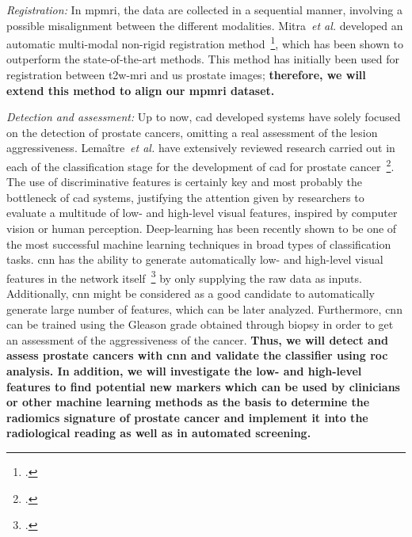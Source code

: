 \emph{Registration:}
In \ac{mpmri}, the data are collected in a sequential manner, involving a possible misalignment between the different modalities.
Mitra~\emph{et al.} developed an automatic multi-modal non-rigid registration method~\footcite{Mitra2012a}, which has been shown to outperform the state-of-the-art methods.
This method has initially been used for registration between \ac{t2w}-\ac{mri} and \ac{us} prostate images; \textbf{therefore, we will extend this method to align our \ac{mpmri} dataset.}

\emph{Detection and assessment:}
Up to now, \ac{cad} developed systems have solely focused on the detection of prostate cancers, omitting a real assessment of the lesion aggressiveness.
Lema\^itre~\emph{et al.} have extensively reviewed research carried out in each of the classification stage for the development of \ac{cad} for prostate cancer~\footcite{Lemaitre2015}.
The use of discriminative features is certainly key and most probably the bottleneck of \ac{cad} systems, justifying the attention given by researchers to evaluate a multitude of low- and high-level visual features, inspired by computer vision or human perception.
Deep-learning has been recently shown to be one of the most successful machine learning techniques in broad types of classification tasks.
\ac{cnn} has the ability to generate automatically low- and high-level visual features in the network itself~\footcite{Zeiler2013} by only supplying the raw data as inputs.
Additionally, \ac{cnn} might be considered as a good candidate to automatically generate large number of features, which can be later analyzed.
Furthermore, \ac{cnn} can be trained using the Gleason grade obtained through biopsy in order to get an assessment of the aggressiveness of the cancer.
\textbf{Thus, we will detect and assess prostate cancers with \ac{cnn} and validate the classifier using \ac{roc} analysis.
  In addition, we will investigate the low- and high-level features to find potential new markers which can be used by clinicians or other machine learning methods as the basis to determine the radiomics signature of prostate cancer and implement it into the radiological reading as well as in automated screening.}

